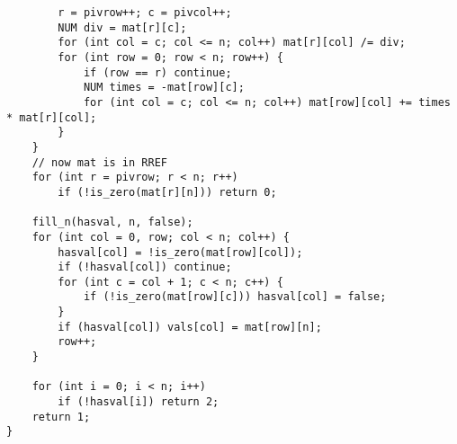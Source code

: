 \documentclass[8pt,a4paper,landscape,oneside]{amsart}
\begin{document}
\begin{multicols*}{3}
\begin{lstlisting}
		r = pivrow++; c = pivcol++;
		NUM div = mat[r][c];
		for (int col = c; col <= n; col++) mat[r][col] /= div;
		for (int row = 0; row < n; row++) {
			if (row == r) continue;
			NUM times = -mat[row][c];
			for (int col = c; col <= n; col++) mat[row][col] += times * mat[r][col];
		}
	}
	// now mat is in RREF
	for (int r = pivrow; r < n; r++)
		if (!is_zero(mat[r][n])) return 0;

	fill_n(hasval, n, false);
	for (int col = 0, row; col < n; col++) {
		hasval[col] = !is_zero(mat[row][col]);
		if (!hasval[col]) continue;
		for (int c = col + 1; c < n; c++) {
			if (!is_zero(mat[row][c])) hasval[col] = false;
		}
		if (hasval[col]) vals[col] = mat[row][n];
		row++;
	}

	for (int i = 0; i < n; i++)
		if (!hasval[i]) return 2;
	return 1;
}
\end{lstlisting}
\end{multicols*}
\end{document}
